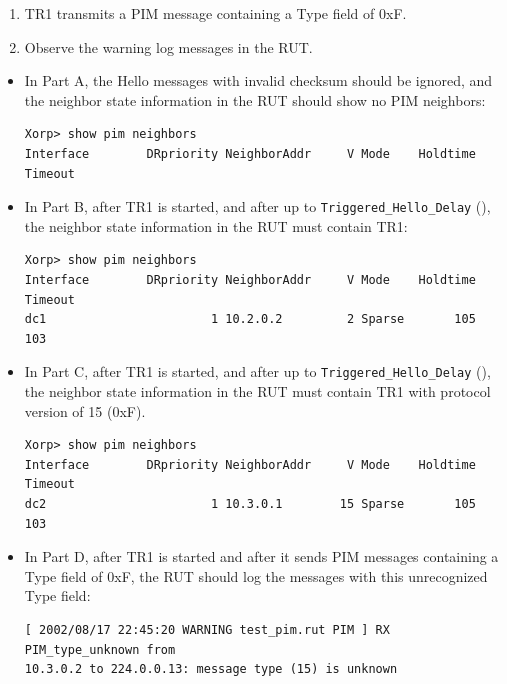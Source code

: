 \documentclass[11pt]{report}
\begin{document}

\begin{enumerate}

  \item TR1 transmits a PIM message containing a Type field of 0xF.

  \item Observe the warning log messages in the RUT.

\end{enumerate}

\begin{itemize}

  \item In Part A, the Hello messages with invalid checksum should be ignored,
        and the neighbor state information in the RUT should show no PIM
        neighbors:

\begin{verbatim}
Xorp> show pim neighbors 
Interface        DRpriority NeighborAddr     V Mode    Holdtime Timeout
\end{verbatim}


  \item In Part B, after TR1 is started, and after up to
        \verb=Triggered_Hello_Delay=
        ({\PimsmTriggeredHelloDelay}), the neighbor state information in the
        RUT must contain TR1:

\begin{verbatim}
Xorp> show pim neighbors 
Interface        DRpriority NeighborAddr     V Mode    Holdtime Timeout
dc1                       1 10.2.0.2         2 Sparse       105     103
\end{verbatim}

  \item In Part C, after TR1 is started, and after up to
        \verb=Triggered_Hello_Delay=
        ({\PimsmTriggeredHelloDelay}), the neighbor state information in the
        RUT must contain TR1 with protocol version of 15 (0xF).

\begin{verbatim}
Xorp> show pim neighbors 
Interface        DRpriority NeighborAddr     V Mode    Holdtime Timeout
dc2                       1 10.3.0.1        15 Sparse       105     103
\end{verbatim}

  \item In Part D, after TR1 is started and after it sends PIM messages
        containing a Type field of 0xF, the RUT should log the messages with
        this unrecognized Type field:

\begin{verbatim}
[ 2002/08/17 22:45:20 WARNING test_pim.rut PIM ] RX PIM_type_unknown from
10.3.0.2 to 224.0.0.13: message type (15) is unknown
\end{verbatim}

\end{itemize}
\end{document}
